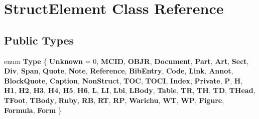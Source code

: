 \hypertarget{class_struct_element}{}\section{Struct\+Element Class Reference}
\label{class_struct_element}
\subsection*{Public Types}
\begin{DoxyCompactItemize}
\item 
\mbox{\label{class_struct_element_a62e73ce3898ddce25ed770e6ac7acd67}} 
enum {\bfseries Type} \{ \newline
{\bfseries Unknown} = 0, 
{\bfseries M\+C\+ID}, 
{\bfseries O\+B\+JR}, 
{\bfseries Document}, 
\newline
{\bfseries Part}, 
{\bfseries Art}, 
{\bfseries Sect}, 
{\bfseries Div}, 
\newline
{\bfseries Span}, 
{\bfseries Quote}, 
{\bfseries Note}, 
{\bfseries Reference}, 
\newline
{\bfseries Bib\+Entry}, 
{\bfseries Code}, 
{\bfseries Link}, 
{\bfseries Annot}, 
\newline
{\bfseries Block\+Quote}, 
{\bfseries Caption}, 
{\bfseries Non\+Struct}, 
{\bfseries T\+OC}, 
\newline
{\bfseries T\+O\+CI}, 
{\bfseries Index}, 
{\bfseries Private}, 
{\bfseries P}, 
\newline
{\bfseries H}, 
{\bfseries H1}, 
{\bfseries H2}, 
{\bfseries H3}, 
\newline
{\bfseries H4}, 
{\bfseries H5}, 
{\bfseries H6}, 
{\bfseries L}, 
\newline
{\bfseries LI}, 
{\bfseries Lbl}, 
{\bfseries L\+Body}, 
{\bfseries Table}, 
\newline
{\bfseries TR}, 
{\bfseries TH}, 
{\bfseries TD}, 
{\bfseries T\+Head}, 
\newline
{\bfseries T\+Foot}, 
{\bfseries T\+Body}, 
{\bfseries Ruby}, 
{\bfseries RB}, 
\newline
{\bfseries RT}, 
{\bfseries RP}, 
{\bfseries Warichu}, 
{\bfseries WT}, 
\newline
{\bfseries WP}, 
{\bfseries Figure}, 
{\bfseries Formula}, 
{\bfseries Form}
 \}
\end{DoxyCompactItemize}
